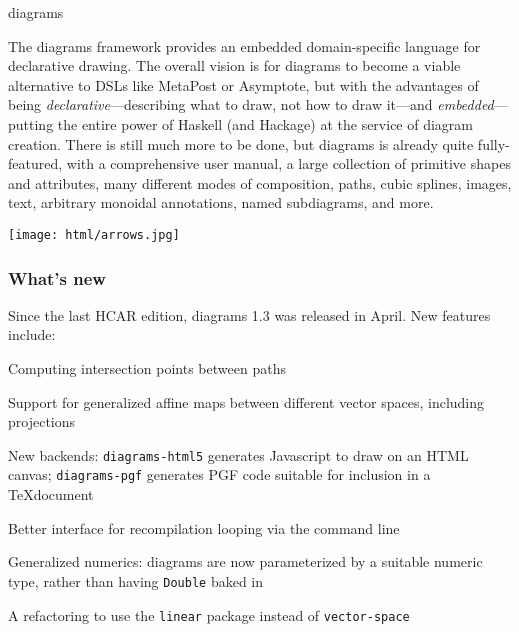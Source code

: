 \begin{hcarentry}[updated]{diagrams}
\makeheader

The diagrams framework provides an embedded domain-specific language
for declarative drawing.  The overall vision is for diagrams to become
a viable alternative to DSLs like MetaPost or Asymptote, but with the
advantages of being \emph{declarative}---describing what to draw, not
how to draw it---and \emph{embedded}---putting the entire power of
Haskell (and Hackage) at the service of diagram creation.  There is
still much more to be done, but diagrams is already quite
fully-featured, with a comprehensive user manual, a large collection
of primitive shapes and attributes, many different modes of
composition, paths, cubic splines, images, text, arbitrary monoidal
annotations, named subdiagrams, and more.

\begin{center}
\texttt{[image: html/arrows.jpg]}
\end{center}

\subsubsection*{What's new}

Since the last HCAR edition, diagrams 1.3 was released in April.
New features include:
\begin{compactitem}
\item Computing intersection points between paths
\item Support for generalized affine maps between different vector
  spaces, including projections
\item New backends: \texttt{diagrams-html5} generates Javascript to draw on an
  HTML canvas; \texttt{diagrams-pgf} generates PGF code suitable for
  inclusion in a \TeX document
\item Better interface for recompilation looping via the command line
\item Generalized numerics: diagrams are now parameterized by a
  suitable numeric type, rather than having \texttt{Double} baked in
\item A refactoring to use the \texttt{linear} package instead of
  \texttt{vector-space}
\end{compactitem}



\end{hcarentry}
